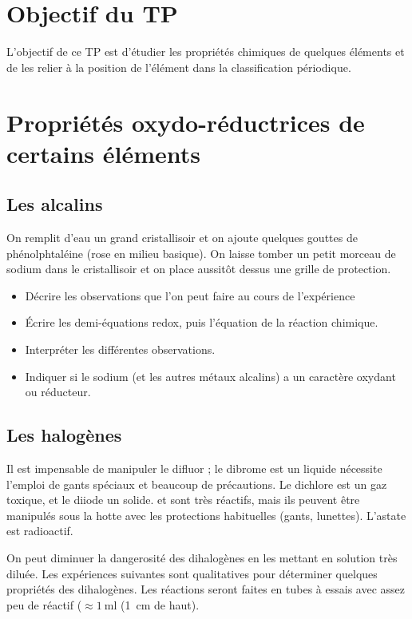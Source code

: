 \documentclass{tp}
\begin{document}

\section{Objectif du TP}
L'objectif de ce TP est d'étudier les propriétés chimiques de quelques éléments et de les relier à la position de l'élément dans la classification périodique.


\section{Propriétés oxydo-réductrices de certains éléments}%
\label{sec:proprietes_oxydo_reductrices_de_certains_elements}

\subsection{Les alcalins}%
\label{sub:les_alcalins}

On remplit d'eau un grand cristallisoir et on ajoute quelques gouttes de phénolphtaléine (rose en milieu basique). On laisse tomber un petit morceau de sodium dans le cristallisoir et on place aussitôt dessus une grille de protection.

\begin{itemize}
  \item Décrire les observations que l'on peut faire au cours de l'expérience
  \item Écrire les demi-équations redox, puis l'équation de la réaction chimique.
  \item Interpréter les différentes observations.
  \item Indiquer si le sodium (et les autres métaux alcalins) a un caractère oxydant ou réducteur.
\end{itemize}

\subsection{Les halogènes}%
\label{sub:les_halogenes}

Il est impensable de manipuler le difluor ; le dibrome est un liquide nécessite l'emploi de gants spéciaux et beaucoup de précautions. Le dichlore est un gaz toxique, et le diiode un solide.  et  sont très réactifs, mais ils peuvent être manipulés sous la hotte avec les protections habituelles (gants, lunettes). L'astate est radioactif.

On peut diminuer la dangerosité des dihalogènes en les mettant en solution très diluée. Les expériences suivantes sont qualitatives pour déterminer quelques propriétés des dihalogènes. Les réactions seront faites en tubes à essais avec assez peu de réactif ($\approx \SI{1}{\milli\litre}$ (\SI{1}{\centi\meter} de haut).  
\end{document}
